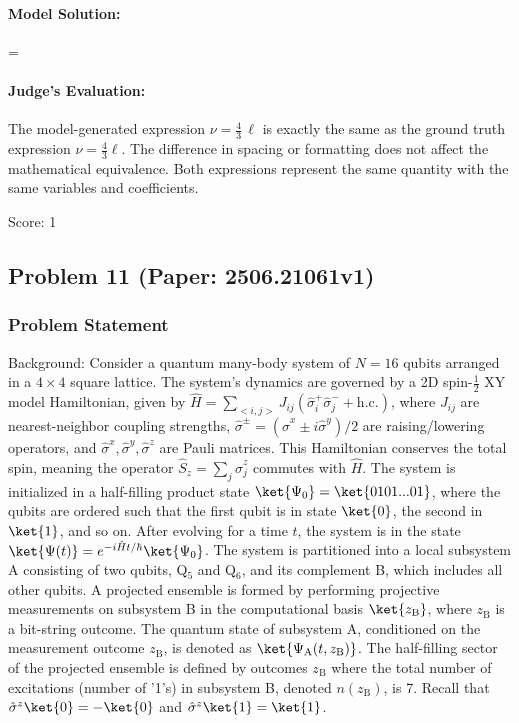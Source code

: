 \documentclass[10pt]{article}
\begin{document}
\paragraph*{Model Solution:}
\displaystyle \nu=\,\ell

\paragraph*{Judge's Evaluation:}

The model-generated expression \(\nu = \frac{4}{3}\,\ell\) is exactly the same as the ground truth expression \(\nu = \frac{4}{3}\ell\). The difference in spacing or formatting does not affect the mathematical equivalence. Both expressions represent the same quantity with the same variables and coefficients.

Score: 1

\newpage
\subsection*{Problem 11 (Paper: 2506.21061v1)}
\subsubsection*{Problem Statement}
Background:
Consider a quantum many-body system of $N=16$ qubits arranged in a $4 \times 4$ square lattice. The system's dynamics are governed by a 2D spin-$\frac{1}{2}$ XY model Hamiltonian, given by $\hat H = \sum _{<i,j>}J_{ij}(\hat\sigma_i^+\hat\sigma_j^-+\mathrm{h.c.})$, where $J_{ij}$ are nearest-neighbor coupling strengths, $\hat\sigma^\pm = (\hat\sigma^x \pm i\hat\sigma^y)/2$ are raising/lowering operators, and $\hat\sigma^x, \hat\sigma^y, \hat\sigma^z$ are Pauli matrices. This Hamiltonian conserves the total spin, meaning the operator $\hat S_z = \sum_j \hat\sigma_j^z$ commutes with $\hat H$. The system is initialized in a half-filling product state $\ket{\Psi_0} = \ket{0101...01}$, where the qubits are ordered such that the first qubit is in state $\ket{0}$, the second in $\ket{1}$, and so on. After evolving for a time $t$, the system is in the state $\ket{\Psi(t)}=e^{-i\hat H t/\hbar }\ket{\Psi_0}$. The system is partitioned into a local subsystem A consisting of two qubits, Q$_5$ and Q$_6$, and its complement B, which includes all other qubits. A projected ensemble is formed by performing projective measurements on subsystem B in the computational basis $\ket{z_\mathrm{B}}$, where $z_\mathrm{B}$ is a bit-string outcome. The quantum state of subsystem A, conditioned on the measurement outcome $z_\mathrm{B}$, is denoted as $\ket{\Psi_{\mathrm{A}}(t,z_\mathrm{B})}$. The half-filling sector of the projected ensemble is defined by outcomes $z_\mathrm{B}$ where the total number of excitations (number of '1's) in subsystem B, denoted $n(z_\mathrm{B})$, is 7. Recall that $\hat\sigma^z \ket{0} = -\ket{0}$ and $\hat\sigma^z \ket{1} = \ket{1}$.
\end{document}
